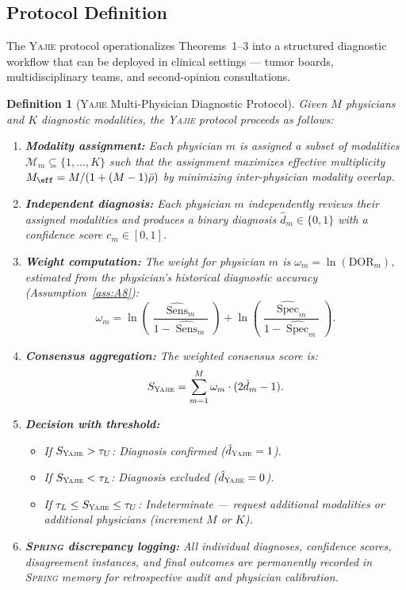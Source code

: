 \documentclass[11pt,a4paper]{article}
\newtheorem{definition}[theorem]{Definition}
\theoremstyle{definition}
\newcommand{\Yajie}{\textsc{Yajie}}
\newcommand{\Spring}{\textsc{Spring}}
\DeclareMathOperator{\Sens}{Sens}
\DeclareMathOperator{\Spec}{Spec}
\newcommand{\diagnosis}{\hat{d}}               %
\newcommand{\modality}{\mathcal{M}}            %
\begin{document}
\subsection{Protocol Definition}

The \Yajie{} protocol operationalizes Theorems~1--3 into a structured
diagnostic workflow that can be deployed in clinical settings --- tumor
boards, multidisciplinary teams, and second-opinion consultations.

\begin{definition}[\Yajie{} Multi-Physician Diagnostic Protocol]
\label{def:yajie_protocol}
Given $M$ physicians and $K$ diagnostic modalities, the \Yajie{} protocol
proceeds as follows:
\begin{enumerate}[label=\textbf{Step \arabic*:}, nosep]
    \item \textbf{Modality assignment:} Each physician $m$ is
    assigned a subset of modalities $\modality_m \subseteq \{1,\dots,K\}$
    such that the assignment maximizes effective multiplicity
    $M_{\eff} = M/(1+(M-1)\bar{\rho})$ by minimizing inter-physician
    modality overlap.
    \item \textbf{Independent diagnosis:} Each physician $m$
    independently reviews their assigned modalities and produces a binary
    diagnosis $\diagnosis_m \in \{0,1\}$ with a confidence score
    $c_m \in [0,1]$.
    \item \textbf{Weight computation:} The weight for physician $m$
    is $\omega_m = \ln(\text{DOR}_m)$, estimated from the physician's
    historical diagnostic accuracy (Assumption~\ref{ass:A8}):
    \begin{equation}
        \omega_m = \ln\!\left(\frac{\hat{\Sens}_m}{1-\hat{\Sens}_m}\right)
                 + \ln\!\left(\frac{\hat{\Spec}_m}{1-\hat{\Spec}_m}\right).
    \end{equation}
    \item \textbf{Consensus aggregation:} The weighted consensus
    score is:
    \begin{equation}
        S_{\Yajie} = \sum_{m=1}^{M} \omega_m \cdot (2\diagnosis_m - 1).
    \end{equation}
    \item \textbf{Decision with threshold:}
    \begin{itemize}[nosep]
        \item If $S_{\Yajie} > \tau_U$: Diagnosis confirmed ($\diagnosis_{\Yajie} = 1$).
        \item If $S_{\Yajie} < \tau_L$: Diagnosis excluded ($\diagnosis_{\Yajie} = 0$).
        \item If $\tau_L \le S_{\Yajie} \le \tau_U$: Indeterminate --- request
        additional modalities or additional physicians (increment $M$ or $K$).
    \end{itemize}
    \item \textbf{\Spring{} discrepancy logging:} All
    individual diagnoses, confidence scores, disagreement instances, and
    final outcomes are permanently recorded in \Spring{} memory for
    retrospective audit and physician calibration.
\end{enumerate}
\end{definition}
\end{document}
